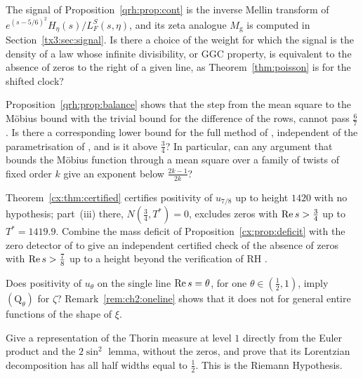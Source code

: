 \begin{problem}\label{qrh:prob:signal}
The signal of Proposition~\ref{qrh:prop:cont} is the inverse Mellin transform of $e^{(s-5/6)^2}H_\eta(s)/L_F^S(s,\eta)$, and its zeta analogue $M_{\mathrm g}$ is computed in Section~\ref{tx3:sec:signal}. Is there a choice of the weight for which the signal is the density of a law whose infinite divisibility, or GGC property, is equivalent to the absence of zeros to the right of a given line, as Theorem~\ref{thm:poisson} is for the shifted clock?
\end{problem}

\begin{problem}\label{qrh:prob:exponent}
Proposition~\ref{qrh:prop:balance} shows that the step from the mean square to the M\"obius bound with the trivial bound for the difference of the rows, cannot pass $\frac67$. Is there a corresponding lower bound for the full method of \cite{OAI26a}, independent of the parametrisation of \cite{Liu26a}, and is it above $\frac34$? In particular, can any argument that bounds the M\"obius function through a mean square over a family of twists of fixed order $k$ give an exponent below $\frac{2k-1}{2k}$?
\end{problem}

\begin{problem}\label{qrh:prob:cert}
Theorem~\ref{cx:thm:certified} certifies positivity of $u_{7/8}$ up to height $1420$ with no hypothesis; part~(iii) there, $N(\frac34,T^*)=0$, excludes zeros with $\operatorname{Re} s>\frac34$ up to $T^*=1419.9$. Combine the mass deficit of Proposition~\ref{cx:prop:deficit} with the zero detector of \cite{OAI26a} to give an independent certified check of the absence of zeros with $\operatorname{Re} s>\frac78$ up to a height beyond the verification of RH \cite{PT21}.
\end{problem}

\begin{problem}\label{qrh:prob:oneline}
Does positivity of $u_\theta$ on the single line $\operatorname{Re} s=\theta$, for one $\theta\in(\frac12,1)$, imply $(\mathrm Q_\theta)$ for $\zeta$? Remark~\ref{rem:ch2:oneline} shows that it does not for general entire functions of the shape of $\xi$.
\end{problem}

\begin{problem}\label{qrh:prob:levelone}
Give a representation of the Thorin measure at level $1$ directly from the Euler product and the $2\sin^2$ lemma, without the zeros, and prove that its Lorentzian decomposition has all half widths equal to $\frac12$. This is the Riemann Hypothesis.
\end{problem}

